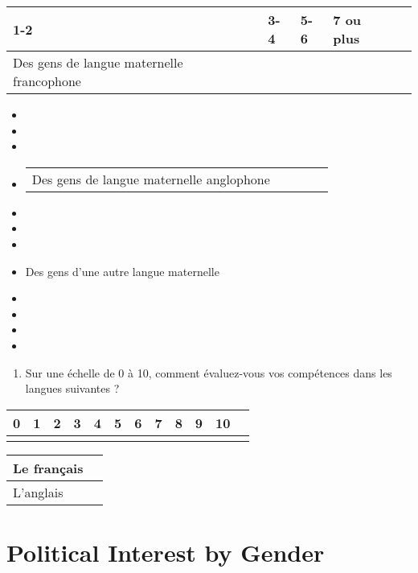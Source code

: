 \documentclass[
  letterpaper,
  DIV=11,
  numbers=noendperiod]{scrreprt}
\providecommand{\tightlist}{%
  \setlength{\itemsep}{0pt}\setlength{\parskip}{0pt}}\usepackage{longtable,booktabs,array}
\begin{document}
\begin{longtable}[]{@{}lllll@{}}
\toprule\noalign{}
1-2 & 3-4 & 5-6 & 7 ou plus & \\
\midrule\noalign{}
\endhead
\bottomrule\noalign{}
\endlastfoot
Des gens de langue maternelle francophone & & & & \\
\end{longtable}

\begin{itemize}
\item
\item
\item
\item
  \begin{longtable}[]{@{}lllll@{}}
  \toprule\noalign{}
  \endhead
  \bottomrule\noalign{}
  \endlastfoot
  Des gens de langue maternelle anglophone & & & & \\
  \end{longtable}
\item
\item
\item
\item
  \hfill\break
  Des gens d'une autre langue maternelle \textbar{}
\item
\item
\item
\item
\end{itemize}

\begin{enumerate}
\def\labelenumi{\arabic{enumi}.}
\setcounter{enumi}{65}
\tightlist
\item
  Sur une échelle de 0 à 10, comment évaluez-vous vos compétences dans
  les langues suivantes ?
\end{enumerate}

\begin{longtable}[]{@{}llllllllllll@{}}
\toprule\noalign{}
0 & 1 & 2 & 3 & 4 & 5 & 6 & 7 & 8 & 9 & 10 & \\
\midrule\noalign{}
\endhead
\bottomrule\noalign{}
\endlastfoot
\end{longtable}

\begin{longtable}[]{@{}ll@{}}
\toprule\noalign{}
Le français & \\
\midrule\noalign{}
\endhead
\bottomrule\noalign{}
\endlastfoot
L'anglais & \\
\end{longtable}

\chapter{Political Interest by Gender}\label{sec-appendix4}
\end{document}
